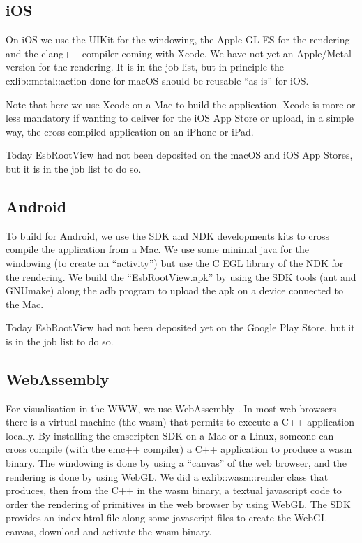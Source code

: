 \documentclass{webofc}
\begin{document}
\subsection{iOS}
On iOS we use the UIKit for the windowing, the Apple GL-ES for the
rendering and the clang++ compiler coming with Xcode. We have not yet
an Apple/Metal version for the rendering. It is in the job list, but in
principle the exlib::metal::action done for macOS should be reusable
``as is'' for iOS.

Note that here we use Xcode on a Mac to build the application. Xcode is more or
less mandatory if wanting to deliver for the iOS App Store or upload,
in a simple way, the cross compiled application on an iPhone or iPad.

Today EsbRootView had not been deposited on the macOS and
iOS App Stores, but it is in the job list to do so.

\subsection{Android}
To build for Android, we use the SDK and NDK developments kits to
cross compile the application from a Mac. We use some minimal java for the windowing (to create an ``activity'')
but use the C EGL library of the NDK for the rendering. We build the
``EsbRootView.apk'' by using the SDK tools (ant and GNUmake) along the
adb program to upload the apk on a device connected to the Mac.

Today EsbRootView had not been deposited yet on the Google
Play Store, but it is in the job list to do so.

\subsection{WebAssembly}
 For visualisation in the WWW, we use WebAssembly \cite{WebAssembly}. In most web browsers there
 is a virtual machine (the wasm) that permits to execute a C++
 application locally. By installing the emscripten SDK on a Mac or a Linux, someone can cross compile
 (with the emc++ compiler) a C++ application to produce a wasm binary. The windowing is done by using a
 ``canvas'' of the web browser, and the rendering is done by using WebGL.
We did a exlib::wasm::render class that produces, then from the C++ in
the wasm binary, a textual javascript code to order the rendering of
primitives in the web browser by using WebGL. The SDK provides an
index.html file along some javascript files to create the WebGL
canvas, download and activate the wasm binary.
\end{document}
